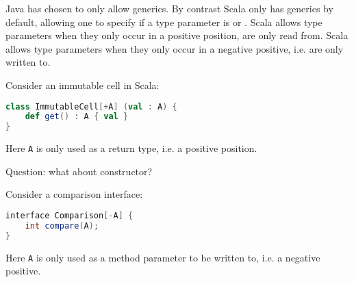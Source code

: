 \documentclass{article}
\begin{document}
Java has chosen to only allow \textit{\invar{}} generics.
By contrast Scala only has \invar{} generics by default, allowing one to specify if a type parameter is \covar{} or \contra{}. Scala allows \contra{} type parameters when they only occur in a positive position, are only read from.
Scala allows \contra{} type parameters when they only occur in a negative positive, i.e. are only written to.

\begin{example}
Consider an immutable cell in Scala:
\begin{lstlisting}[escapechar=|, language=Scala]
class ImmutableCell[+A] (val : A) {
    def get() : A { val }
}
\end{lstlisting}
Here \texttt{A} is only used as a return type, i.e. a positive position.

Question: what about constructor?
\end{example}

\begin{example}
Consider a comparison interface:
\begin{lstlisting}[escapechar=|, language=Scala]
interface Comparison[-A] {
    int compare(A);
}
\end{lstlisting}
Here \texttt{A} is only used as a method parameter to be written to, i.e. a negative positive.
\end{example}
\end{document}
